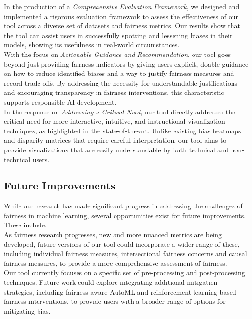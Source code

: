 \documentclass[runningheads]{llncs}
\begin{document}
In the production of a \textit{Comprehensive Evaluation Framework}, we designed and implemented a rigorous evaluation framework to assess the effectiveness of our tool across a diverse set of datasets and fairness metrics. Our results show that the tool can assist users in successfully spotting and lessening biases in their models, showing its usefulness in real-world circumstances.\\

With the focus on \textit{Actionable Guidance and Recommendation}, our tool goes beyond just providing fairness indicators by giving users explicit, doable guidance on how to reduce identified biases and a way to justify fairness measures and record trade-offs. By addressing the necessity for understandable justifications and encouraging transparency in fairness interventions, this characteristic supports responsible AI development.\\

In the response on \textit{Addressing a Critical Need}, our tool directly addresses the critical need for more interactive, intuitive, and instructional visualization techniques, as highlighted in the state-of-the-art. Unlike existing bias heatmaps and disparity matrices that require careful interpretation, our tool aims to provide visualizations that are easily understandable by both technical and non-technical users.

\subsection{Future Improvements}
While our research has made significant progress in addressing the challenges of fairness in machine learning, several opportunities exist for future improvements. These include:\\

As fairness research progresses, new and more nuanced metrics are being developed, future versions of our tool could incorporate a wider range of these, including individual fairness measures, intersectional fairness concerns and causal fairness measures, to provide a more comprehensive assessment of fairness.\\

Our tool currently focuses on a specific set of pre-processing and post-processing techniques. Future work could explore integrating additional mitigation strategies, including fairness-aware AutoML and reinforcement learning-based fairness interventions, to provide users with a broader range of options for mitigating bias.\\
\end{document}
